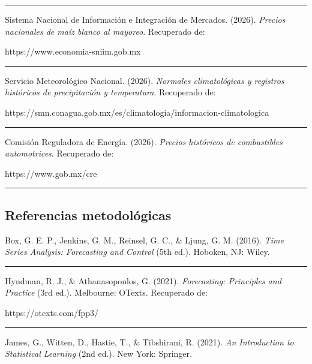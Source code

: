 \documentclass[11pt]{article}
\begin{document}
\begin{center}\rule{0.5\linewidth}{0.5pt}\end{center}

Sistema Nacional de Información e Integración de Mercados. (2026).
\emph{Precios nacionales de maíz blanco al mayoreo}. Recuperado de:

https://www.economia-sniim.gob.mx

\begin{center}\rule{0.5\linewidth}{0.5pt}\end{center}

Servicio Meteorológico Nacional. (2026). \emph{Normales climatológicas y
registros históricos de precipitación y temperatura}. Recuperado de:

https://smn.conagua.gob.mx/es/climatologia/informacion-climatologica

\begin{center}\rule{0.5\linewidth}{0.5pt}\end{center}

Comisión Reguladora de Energía. (2026). \emph{Precios históricos de
combustibles automotrices}. Recuperado de:

https://www.gob.mx/cre

\begin{center}\rule{0.5\linewidth}{0.5pt}\end{center}

\hypertarget{referencias-metodoluxf3gicas}{%
\subsection{Referencias
metodológicas}\label{referencias-metodoluxf3gicas}}

Box, G. E. P., Jenkins, G. M., Reinsel, G. C., \& Ljung, G. M. (2016).
\emph{Time Series Analysis: Forecasting and Control} (5th ed.). Hoboken,
NJ: Wiley.

\begin{center}\rule{0.5\linewidth}{0.5pt}\end{center}

Hyndman, R. J., \& Athanasopoulos, G. (2021). \emph{Forecasting:
Principles and Practice} (3rd ed.). Melbourne: OTexts. Recuperado de:

https://otexts.com/fpp3/

\begin{center}\rule{0.5\linewidth}{0.5pt}\end{center}

James, G., Witten, D., Hastie, T., \& Tibshirani, R. (2021). \emph{An
Introduction to Statistical Learning} (2nd ed.). New York: Springer.
\end{document}

